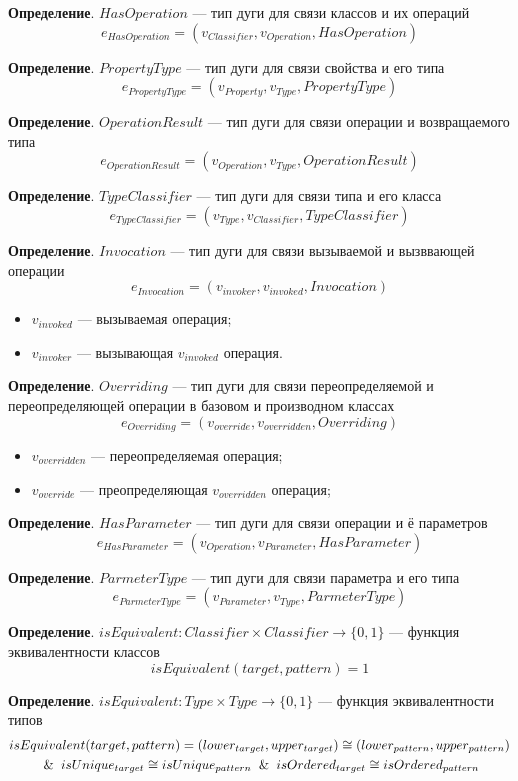 \textbf{Определение}. $HasOperation$ --- тип дуги для связи классов и их операций
%
$$e_{HasOperation} = (v_{Classifier}, v_{Operation}, HasOperation)$$

\textbf{Определение}. $PropertyType$ --- тип дуги для связи свойства и его типа
%
$$e_{PropertyType} = (v_{Property}, v_{Type}, PropertyType)$$

\textbf{Определение}. $OperationResult$ --- тип дуги для связи операции и возвращаемого типа
%
$$e_{OperationResult} = (v_{Operation}, v_{Type}, OperationResult)$$

\textbf{Определение}. $TypeClassifier$ --- тип дуги для связи типа и его класса
%
$$e_{TypeClassifier} = (v_{Type}, v_{Classifier}, TypeClassifier)$$

\textbf{Определение}. $Invocation$ --- тип дуги для связи вызываемой и вызввающей операции
%
$$e_{Invocation} = (v_{invoker}, v_{invoked}, Invocation)$$
%
\begin{itemize}
\item $v_{invoked}$ --- вызываемая операция;
\item $v_{invoker}$ --- вызывающая $v_{invoked}$ операция.
\end{itemize}

\textbf{Определение}. $Overriding$ --- тип дуги для связи
переопределяемой и переопределяющей операции в базовом и производном классах
%
$$e_{Overriding} = (v_{override}, v_{overridden}, Overriding)$$

\begin{itemize}
\item $v_{overridden}$ --- переопределяемая операция;
\item $v_{override}$ --- преопределяющая $v_{overridden}$ операция;
\end{itemize}

\textbf{Определение}. $HasParameter$ --- тип дуги для связи операции и ё параметров
%
$$e_{HasParameter} = (v_{Operation}, v_{Parameter}, HasParameter)$$

\textbf{Определение}. $ParmeterType$ --- тип дуги для связи параметра и его типа
%
$$e_{ParmeterType} = (v_{Parameter}, v_{Type}, ParmeterType)$$

\textbf{Определение}. $isEquivalent: Classifier \times Classifier \to \{ 0, 1 \}$
--- функция эквивалентности классов
%
$$isEquivalent(target, pattern) = 1$$

\textbf{Определение}. $isEquivalent: Type \times Type \to \{ 0, 1 \}$
--- функция эквивалентности типов
%
\begin{multline*}
isEquivalent(target, pattern) = (lower_{target}, upper_{target}) \cong (lower_{pattern}, upper_{pattern}) \\
\And isUnique_{target} \cong isUnique_{pattern} \And isOrdered_{target} \cong isOrdered_{pattern}
\end{multline*}

